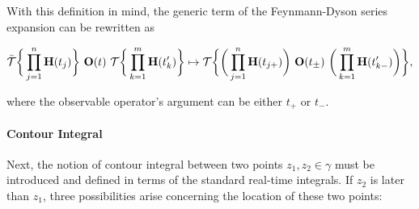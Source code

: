 With this definition in mind, the generic term of the Feynmann-Dyson series expansion can be rewritten as 

\begin{equation}
    \bar{\mathcal{T}} \bigg\{
        \prod_{j = 1}^{n} {\bf H}(t_j) 
    \bigg\} \textnormal{ } {\bf O}(t) \textnormal{ } 
    \mathcal{T}
    \bigg\{
        \prod_{k=1}^{m} {\bf H}(t'_k) 
    \bigg\} \mapsto \mathcal{T} \bigg\{ \bigg(\prod_{j = 1}^{n} {\bf H}(t_{j +})\bigg) \textnormal{ } {\bf O}(t_{\pm}) \textnormal{ } \bigg(\prod_{k=1}^{m} {\bf H}(t'_{k-}) \bigg)
    \bigg\},
\end{equation}

where the observable operator's argument can be either $t_{+}$ or $t_{-}$. \smallbreak

\paragraph{Contour Integral}

Next, the notion of contour integral between two points $z_1, z_2 \in \gamma$ must be introduced and defined in terms of the standard real-time integrals. 
If $z_2$ is later than $z_1$, three possibilities arise concerning the location of these two points: 

